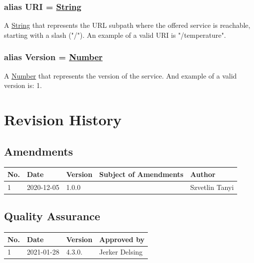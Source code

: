 \documentclass[a4paper]{arrowhead}
\newcommand{\pdef}[1]{{\textcolor{ArrowheadGrey}{#1 \label{sec:model:primitives:#1} \label{sec:model:primitives:#1s}}}}
\newcommand{\pref}[1]{{\textcolor{ArrowheadGrey}{\hyperref[sec:model:primitives:#1]{#1}}}}
\begin{document}
\subsubsection{alias \pdef{URI} = \pref{String}}

A \pref{String} that represents the URL subpath where the offered service is reachable, starting with a slash ("/"). An example of a valid URI is "/temperature".

\subsubsection{alias \pdef{Version} = \pref{Number}}

A \pref{Number} that represents the version of the service. And example of a valid version is: 1.

\newpage




\newpage

\section{Revision History}
\subsection{Amendments}

\noindent\begin{tabularx}{\textwidth}{| p{1cm} | p{3cm} | p{2cm} | X | p{4cm} |} \hline
\rowcolor{gray!33} No. & Date & Version & Subject of Amendments & Author \\ \hline

1 & 2020-12-05 & 1.0.0 & & Szvetlin Tanyi \\ \hline

\end{tabularx}

\subsection{Quality Assurance}

\noindent\begin{tabularx}{\textwidth}{| p{1cm} | p{3cm} | p{2cm} | X |} \hline
\rowcolor{gray!33} No. & Date & Version & Approved by \\ \hline

1 & 2021-01-28 & 4.3.0. & Jerker Delsing\\ \hline

\end{tabularx}
\end{document}
